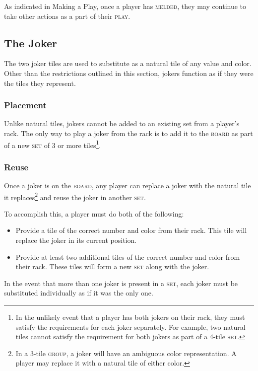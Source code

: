 \documentclass{article}
\begin{document}
\begin{multicols*}{3}
As indicated in Making a Play, once a player has \textsc{melded}, they may
continue to take other actions as a part of their \textsc{play}.

\subsection*{The Joker}
\label{sec:joker}

The two joker tiles are used to substitute as a natural tile of any value and
color. Other than the restrictions outlined in this section, jokers function as
if they were the tiles they represent.

\subsubsection*{Placement}

Unlike natural tiles, jokers cannot be added to an existing set from a player's
rack. The only way to play a joker from the rack is to add it to the
\textsc{board} as part of a new \textsc{set} of 3 or more tiles\footnote{In the
unlikely event that a player has both jokers on their rack, they must satisfy
the requirements for each joker separately. For example, two natural tiles
cannot satisfy the requirement for both jokers as part of a 4-tile
\textsc{set}.}.

\subsubsection*{Reuse}

Once a joker is on the \textsc{board}, any player can replace a joker with the
natural tile it replaces\footnote{In a 3-tile \textsc{group}, a joker will have
an ambiguous color representation. A player may replace it with a natural tile
of either color.} and reuse the joker in another \textsc{set}.

To accomplish this, a player must do both of the following:

\begin{itemize}
	\item Provide a tile of the correct number and color from their rack.
		This tile will replace the joker in its current position.
	\item Provide at least two additional tiles of the correct number and
		color from their rack. These tiles will form a new \textsc{set}
		along with the joker.
\end{itemize}

In the event that more than one joker is present in a \textsc{set}, each joker
must be substituted individually as if it was the only one.


\end{multicols*}
\end{document}
